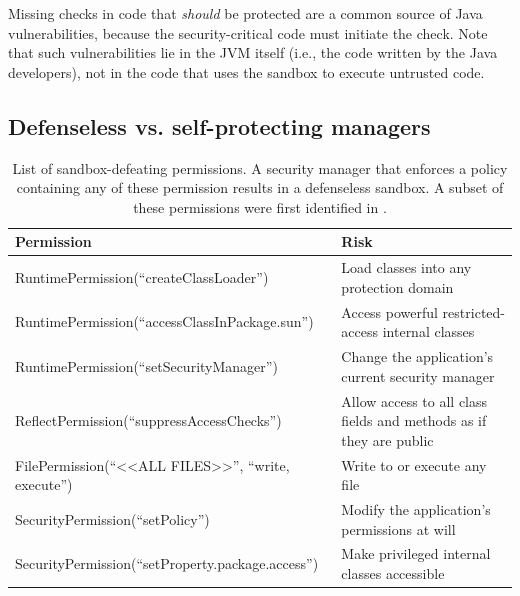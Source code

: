 \documentclass{sig-alternate}
\begin{document}
Missing checks in code that \emph{should} be protected are a common
source of Java vulnerabilities, because the security-critical code must initiate
the check.  Note that such vulnerabilities lie in the JVM itself (i.e., the code
written by the Java developers), not in the code that uses the sandbox to
execute untrusted code.

\subsection{Defenseless vs. self-protecting managers}
\label{sec:secmanagers}

\begin{table}
\caption{List of sandbox-defeating permissions. A security manager that enforces
a policy containing any of these permission results
\label{tab:defenseless-permissions}
in a defenseless sandbox. A subset of these permissions were first identified in \cite{security_explorations_2012}. 
}
\begin{tabular}{ll}
\toprule 
\textbf{Permission} & \textbf{Risk}\tabularnewline
\midrule
RuntimePermission(``createClassLoader'') & Load classes into any protection domain\tabularnewline
RuntimePermission(``accessClassInPackage.sun'') & Access powerful restricted-access internal classes\tabularnewline
RuntimePermission(``setSecurityManager'') & Change the application's current security manager\tabularnewline
ReflectPermission(``suppressAccessChecks'') & Allow access to all class fields and methods as if they are public\tabularnewline
FilePermission(``<\textcompwordmark{}<ALL FILES>\textcompwordmark{}>'',
``write, execute'') & Write to or execute any file\tabularnewline
SecurityPermission(``setPolicy'') & Modify the application's permissions at will\tabularnewline
SecurityPermission(``setProperty.package.access'') & Make privileged internal classes accessible\tabularnewline
\bottomrule
\end{tabular}
\vspace{-0.5cm}
\end{table}
\end{document}
